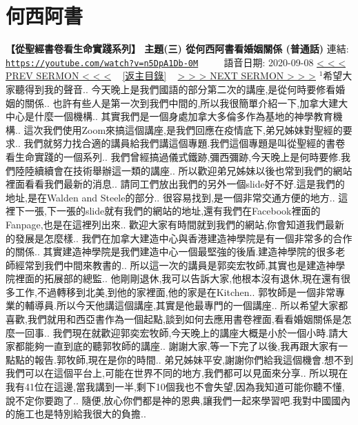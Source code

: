 \documentclass{book}
\begin{document}
\section{何西阿書}
\label{sec:n5DpA1Db_0M}
\textbf{【從聖經書卷看生命實踐系列】 主題(三) 從何西阿書看婚姻關係 (普通話)}
\newline
\newline
連結: \href{https://youtube.com/watch?v=n5DpA1Db-0M}{\texttt{https://youtube.com/watch?v=n5DpA1Db-0M}} ~~~~ 語音日期: 2020-09-08
\newline
\newline
\hyperref[sec:XLKUZGl9ItY]{\small{< < < PREV SERMON < < <}}
~
\hyperref[sec:index]{\small{[返主目錄]}}
~
\hyperref[sec:DOwKowWHLkM]{\small{> > > NEXT SERMON > > >}}
\newline
\newline
$^{1}$希望大家聽得到我的聲音..
今天晚上是我們國語的部分第二次的講座,是從何時要修看婚姻的關係..
也許有些人是第一次到我們中間的,所以我很簡單介紹一下,加拿大建大中心是什麼一個機構..
其實我們是一個身處加拿大多倫多作為基地的神學教育機構..
這次我們使用Zoom來搞這個講座,是我們回應在疫情底下,弟兄姊妹對聖經的要求..
我們就努力找合適的講員給我們講這個專題.我們這個專題是叫從聖經的書卷看生命實踐的一個系列..
我們曾經搞過儀式鐵跡,彌西彌跡,今天晚上是何時要修.我們陸陸續續會在技術舉辦這一類的講座..
所以歡迎弟兄姊妹以後也常到我們的網站裡面看看我們最新的消息..
請同工們放出我們的另外一個slide好不好.這是我們的地址,是在Walden and Steele的部分..
很容易找到,是一個非常交通方便的地方..
這裡下一張,下一張的slide就有我們的網站的地址,還有我們在Facebook裡面的Fanpage,也是在這裡列出來..
歡迎大家有時間就到我們的網站,你會知道我們最新的發展是怎麼樣..
我們在加拿大建造中心與香港建造神學院是有一個非常多的合作的關係..
其實建造神學院是我們建造中心一個最堅強的後盾.建造神學院的很多老師經常到我們中間來教書的..
所以這一次的講員是郭奕宏牧師,其實也是建造神學院裡面的拓展部的總監..
他剛剛退休,我可以告訴大家,他根本沒有退休,現在還有很多工作,不過轉移到北美,到他的家裡面,他的家是在Kitchen..
郭牧師是一個非常專業的輔導員.所以今天他講這個講座,其實是他最專門的一個講座..
所以希望大家都喜歡,我們就用和西亞書作為一個起點,談到如何去應用書卷裡面,看看婚姻關係是怎麼一回事..
我們現在就歡迎郭奕宏牧師,今天晚上的講座大概是小於一個小時.請大家都能夠一直到底的聽郭牧師的講座..
謝謝大家,等一下完了以後,我再跟大家有一點點的報告.郭牧師,現在是你的時間..
弟兄姊妹平安,謝謝你們給我這個機會.想不到我們可以在這個平台上,可能在世界不同的地方,我們都可以見面來分享..
所以現在我有41位在這邊,當我講到一半,剩下10個我也不會失望,因為我知道可能你聽不懂,說不定你要跑了..
隨便,放心你們都是神的恩典,讓我們一起來學習吧.我對中國國內的施工也是特別給我很大的負擔..
\end{document}
